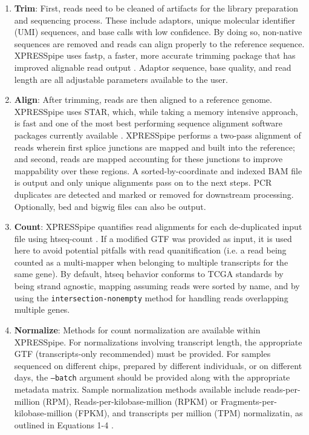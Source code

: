 \documentclass[11pt, a4paper, oneside]{article}
\begin{document}
\begin{enumerate}
  \item \textbf{Trim}: First, reads need to be cleaned of artifacts for the library preparation and sequencing process. These include adaptors, unique molecular identifier (UMI) sequences, and base calls with low confidence. By doing so, non-native sequences are removed and reads can align properly to the reference sequence. XPRESSpipe uses fastp, a faster, more accurate trimming package that has improved alignable read output \cite{fastp}. Adaptor sequence, base quality, and read length are all adjustable parameters available to the user.
  \item \textbf{Align}: After trimming, reads are then aligned to a reference genome. XPRESSpipe uses STAR, which, while taking a memory intensive approach, is fast and one of the most best performing sequence alignment software packages currently available \cite{star, baruzzo_natmeth}. XPRESSpipe performs a two-pass alignment of reads wherein first splice junctions are mapped and built into the reference; and second, reads are mapped accounting for these junctions to improve mappability over these regions. A sorted-by-coordinate and indexed BAM file is output and only unique alignments pass on to the next steps. PCR duplicates are detected and marked or removed for downstream processing. Optionally, bed and bigwig files can also be output.
  \item \textbf{Count}: XPRESSpipe quantifies read alignments for each de-duplicated input file using htseq-count \cite{htseq}. If a modified GTF was provided as input, it is used here to avoid potential pitfalls with read quanitification (i.e. a read being counted as a multi-mapper when belonging to multiple transcripts for the same gene). By default, htseq behavior conforms to TCGA standards by being strand agnostic, mapping assuming reads were sorted by name, and by using the \texttt{intersection-nonempty} method for handling reads overlapping multiple genes.
  \item \textbf{Normalize}: Methods for count normalization are available within XPRESSpipe. For normalizations involving transcript length, the appropriate GTF (transcripts-only recommended) must be provided. For samples sequenced on different chips, prepared by different individuals, or on different days, the \texttt{--batch} argument should be provided along with the appropriate metadata matrix. Sample normalization methods available include reads-per-million (RPM), Reads-per-kilobase-million (RPKM) or Fragments-per-kilobase-million (FPKM), and transcripts per million (TPM) normalizatin, as outlined in Equations 1-4 \cite{evans_briefbio}.


\end{enumerate}
\end{document}
